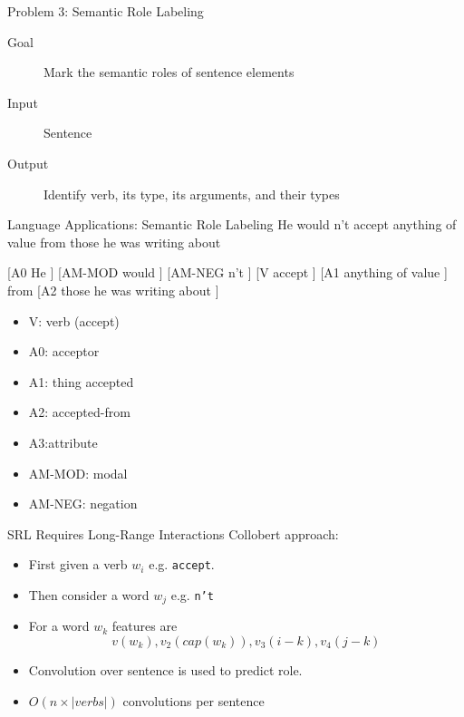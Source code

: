 \documentclass{beamer}
\begin{document}

\begin{frame}{Problem 3: Semantic Role Labeling}
  \begin{description}
  \item[Goal] Mark the semantic roles of sentence elements
  \item[Input] Sentence
  \item[Output] Identify verb, its type, its arguments, and their types
  \end{description}  
\end{frame}

\begin{frame}{Language Applications: Semantic Role Labeling }
 He  would  n't accept anything of value from those he was writing about  

 \air 

 [A0 He ] [AM-MOD would ] [AM-NEG n't ] [V accept ] [A1 anything of value ] from [A2 those he was writing about ] 

 \begin{itemize}
 \item V: verb (accept)
 \item A0: acceptor 
 \item A1: thing accepted 
 \item A2: accepted-from 
 \item A3:attribute 
 \item AM-MOD: modal 
 \item  AM-NEG: negation
 \end{itemize}
\end{frame}

\begin{frame}{SRL Requires Long-Range Interactions}
  Collobert approach:
  \begin{itemize}
  \item   First given a verb $w_i$ e.g. \texttt{accept}.
    \air 
  \item  Then consider a word $w_j$ e.g. \texttt{n't}
    \air
  \item  For a word $w_k$ features are 
    \[v(w_k), v_2(cap(w_k)), v_3(i-k), v_4(j-k)\]

    \air
  \item Convolution over sentence is used to predict role.
    \air 
  \item $O(n \times |verbs|)$ convolutions per sentence
  \end{itemize}
\end{frame}
\end{document}
